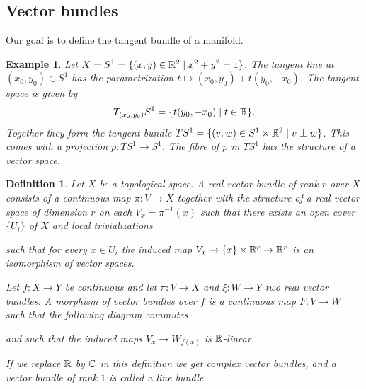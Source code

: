 \documentclass[A4paper, british, reqno]{amsart}
\theoremstyle{darkgreentheorem}
\theoremstyle{darkbluedefinition}
\newtheorem{defn}[thm]{Definition}
\theoremstyle{darkredexample}
\newtheorem{exa}[thm]{Example}
\theoremstyle{remark}
\newcommand{\1}{\mathbbm{1}}
\begin{document}
\subsection{Vector bundles}

Our goal is to define the tangent bundle of a manifold.

\begin{exa}
    Let $X=S^{1}=\{(x,y)\in \mathbb{R}^{2}\mid x^{2}+y^{2}=1\}$.
    The tangent line at $(x_{0},y_{0})\in S^{1}$ has the parametrization $t\mapsto (x_{0},y_{0})+t(y_{0},-x_{0})$.
    The tangent space is given by
    \[ T_{(x_{0},y_{0})}S^{1}=\{ t(y_{0},-x_{0})\mid t\in \mathbb{R}\}.\]
    Together they form the tangent bundle $TS^{1}=\{(v,w)\in S^{1}\times \mathbb{R}^{2}\mid v\perp w\}$.
    This comes with a projection $p\colon TS^{1}\to S^{1}$.
    The fibre of $p$ in $TS^{1}$ has the structure of a vector space.
\end{exa}

\begin{defn}
    Let $X$ be a topological space.
    A \textit{real vector bundle} of rank $r$ over $X$ consists of a continuous map $\pi\colon V\to X$ together with the structure of a real vector space of dimension $r$ on each $V_{x}=\pi^{-1}(x)$ such that there exists an open cover $\{U_{i}\}$ of $X$ and local trivializations
    \begin{center}
    \end{center}
    such that for every $x\in U_{i}$ the induced map $V_{x}\to \{x\}\times \mathbb{R}^{r}\to \mathbb{R}^{r}$ is an isomorphism of vector spaces.

    Let $f\colon X\to Y$ be continuous and let $\pi\colon V\to X$ and $\xi\colon W\to Y$ two real vector bundles.
    A morphism of vector bundles over $f$ is a continuous map $F\colon V\to W$ such that the following diagram commutes
    \begin{center}
    \end{center}
    and such that the induced maps $V_{x}\to W_{f(x)}$ is $\mathbb{R}$-linear.
    
    If we replace $\mathbb{R}$ by $\mathbb{C}$ in this definition we get \textit{complex vector bundles}, and a vector bundle of rank $1$ is called a \textit{line bundle}.
\end{defn}
\end{document}
